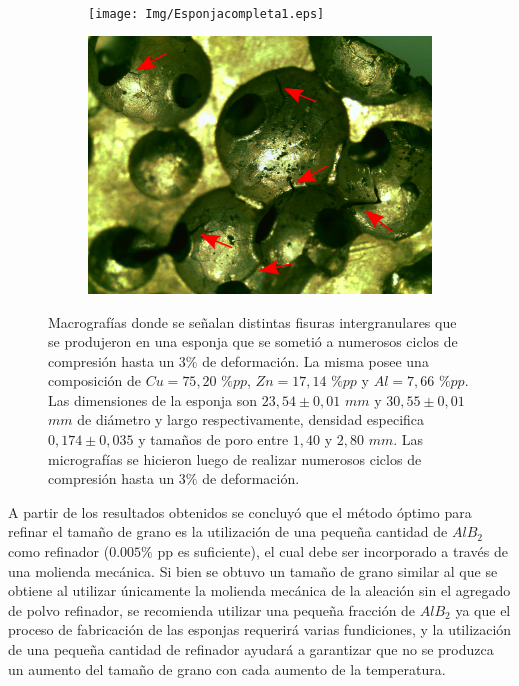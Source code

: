 \documentclass[a4paper,12pt,fleqn,twoside,openany]{book}
\begin{document}
    \begin{figure}%
    \centering
    
    ~ %
     \begin{subfigure}{0.45\textwidth}
        \texttt{[image: Img/Esponjacompleta1.eps]}
        \caption{}
        \label{fig:EsponjaCompleta1}
    \end{subfigure}
 \begin{subfigure}{0.5\textwidth}
        \includegraphics[width=\textwidth]{Img/Fisuras.eps}
        \caption{}
        \label{fig:Ciclos}
    \end{subfigure}
    \caption{Macrografías donde se señalan distintas fisuras intergranulares que se produjeron en una esponja que se sometió a numerosos ciclos de compresión hasta un $3\%$ de deformación. La misma posee una composición de $Cu=75,20$ $\%pp$, $Zn=17,14$ $\%pp$ y $Al=7,66$ $\%pp$. Las dimensiones de la esponja son $23,54 \pm0,01$ $mm$ y $30,55 \pm0,01$ $mm$ de diámetro y largo respectivamente, densidad especifica $0,174 \pm 0,035$ y tamaños de poro entre $1,40 $ y $2,80$ $mm$. Las micrografías se hicieron luego de realizar numerosos ciclos de compresión hasta un $3\%$ de deformación.}
    \label{fig:Fisuras}
    \end{figure}
 

A partir de los resultados obtenidos se concluyó que el método óptimo para refinar el tamaño de grano es la utilización de una pequeña cantidad de $AlB_2$ como refinador ($0.005 \%$ pp es suficiente), el cual debe ser incorporado a través de una molienda mecánica. Si bien se obtuvo un tamaño de grano similar al que se obtiene al utilizar únicamente la molienda mecánica de la aleación sin el agregado de polvo refinador, se recomienda utilizar una pequeña fracción de $AlB_2$ ya que el proceso de fabricación de las esponjas requerirá varias fundiciones, y la utilización de una pequeña cantidad de refinador ayudará a garantizar que no se produzca un aumento del tamaño de grano con cada aumento de la temperatura.
\end{document}
